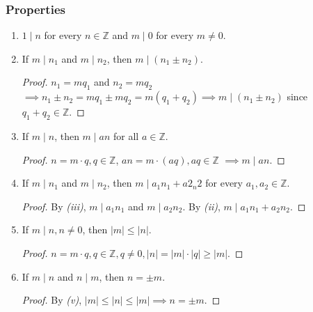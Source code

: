 \documentclass{report}
\newcommand{\Z}{\mathbb{Z}}
\begin{document}
\subsubsection{Properties}
\begin{enumerate}[label=\textit{(\roman*)}]
    \item $1 \mid n$ for every $n \in \Z$ and $m \mid 0$ for every $m \neq 0$.
    \item If $m \mid n_1$ and $m \mid n_2$, then $m \mid (n_1 \pm n_2)$.
        \begin{proof}
            $n_1 = mq_1$ and $n_2 = mq_2$
            \newline
            $\implies n_1 \pm n_2 = mq_1 \pm mq_2 = m(q_1 + q_2) \implies m \mid (n_1 \pm n_2)$ since
            $q_1 + q_2 \in \Z$.
        \end{proof}
    \item If $m \mid n$, then $m \mid an$ for all $a \in \Z$.
        \begin{proof}
            $n = m \cdot q, q \in \Z$, $an = m \cdot (aq), aq \in \Z$
            $\implies m \mid an$.
        \end{proof}
    \item If $m \mid n_1$ and $m \mid n_2$, then $m \mid a_1n_1 + a2_n2$ for every $a_1, a_2 \in \Z$.
        \begin{proof}
            By \textit{(iii)}, $m \mid a_1n_1$ and $m \mid a_2n_2$. 
            By \textit{(ii)}, $m \mid a_1n_1 + a_2n_2$.
        \end{proof}
    \item If $m \mid n, n \neq 0$, then $|m| \leq |n|$.
        \begin{proof}
            $n = m \cdot q, q \in \Z, q \neq 0, |n| = |m| \cdot |q| \geq |m|$.
        \end{proof}
    \item If $m \mid n$ and $n \mid m$, then $n = \pm m$.
        \begin{proof}
            By \textit{(v)}, $|m| \leq |n| \leq |m| \implies n = \pm m$.
        \end{proof}
\end{enumerate}
\end{document}
